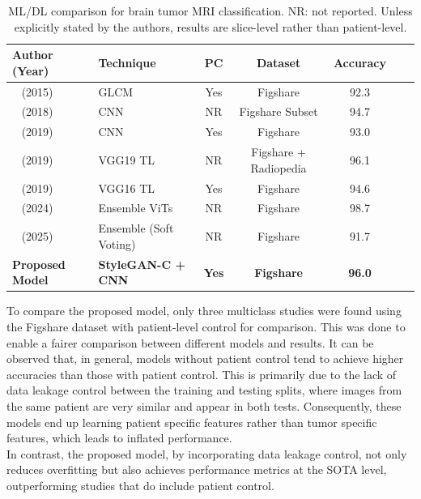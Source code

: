 \begin{table}[H]
\centering
\small
\caption{ML/DL comparison for brain tumor MRI classification. NR: not reported. Unless explicitly stated by the authors, results are slice-level rather than patient-level.}
\label{tab:classification_models_comparison}
\begin{tabular}{llccccc}
\toprule
Author (Year) & Technique & PC & Dataset & Accuracy \\
\midrule
~\cite{Cheng2015} (2015) & GLCM & Yes & Figshare & 92.3 \\
~\cite{abiwinanda} (2018) & CNN & NR & Figshare Subset & 94.7 \\
~\cite{deepak2019brain} (2019) & CNN & Yes & Figshare & 93.0 \\
~\cite{sajjad2019multigrade} (2019) & VGG19 TL & NR & Figshare + Radiopedia & 96.1 \\
~\cite{Rehman2020} (2019) & VGG16 TL & Yes & Figshare & 94.6 \\
~\cite{Tummala2022BrainTumorViT} (2024) & Ensemble ViTs & NR & Figshare & 98.7 \\
~\cite{filvantorkaman2025fusionbasedbraintumorclassification} (2025) & Ensemble (Soft Voting) & NR & Figshare & 91.7 \\
\hline
\textbf{Proposed Model} & \textbf{StyleGAN-C + CNN} & \textbf{Yes} & \textbf{Figshare} & \textbf{96.0} \\
\bottomrule
\end{tabular}
\end{table}

To compare the proposed model, only three multiclass studies were found using the Figshare dataset with patient-level control for comparison. This was done to enable a fairer comparison between different models and results. It can be observed that, in general, models without patient control tend to achieve higher accuracies than those with patient control. This is primarily due to the lack of data leakage control between the training and testing splits, where images from the same patient are very similar and appear in both tests. Consequently, these models end up learning patient specific features rather than tumor specific features, which leads to inflated performance.\\

In contrast, the proposed model, by incorporating data leakage control, not only reduces overfitting but also achieves performance metrics at the SOTA level, outperforming studies that do include patient control.



